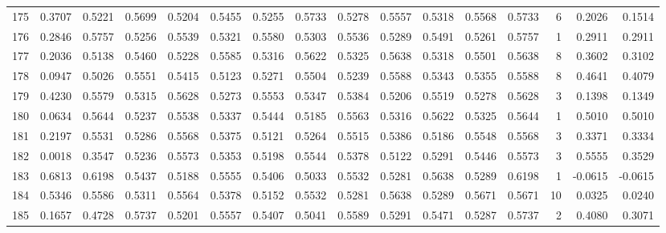 \begin{tabular}{lrrrrrrrrrrrrrrr}
175 &      0.3707 &  0.5221 &  0.5699 &  0.5204 &  0.5455 &  0.5255 &  0.5733 &  0.5278 &  0.5557 &  0.5318 &   0.5568 &     0.5733 &      6 &                    0.2026 &                     0.1514 \\
176 &      0.2846 &  0.5757 &  0.5256 &  0.5539 &  0.5321 &  0.5580 &  0.5303 &  0.5536 &  0.5289 &  0.5491 &   0.5261 &     0.5757 &      1 &                    0.2911 &                     0.2911 \\
177 &      0.2036 &  0.5138 &  0.5460 &  0.5228 &  0.5585 &  0.5316 &  0.5622 &  0.5325 &  0.5638 &  0.5318 &   0.5501 &     0.5638 &      8 &                    0.3602 &                     0.3102 \\
178 &      0.0947 &  0.5026 &  0.5551 &  0.5415 &  0.5123 &  0.5271 &  0.5504 &  0.5239 &  0.5588 &  0.5343 &   0.5355 &     0.5588 &      8 &                    0.4641 &                     0.4079 \\
179 &      0.4230 &  0.5579 &  0.5315 &  0.5628 &  0.5273 &  0.5553 &  0.5347 &  0.5384 &  0.5206 &  0.5519 &   0.5278 &     0.5628 &      3 &                    0.1398 &                     0.1349 \\
180 &      0.0634 &  0.5644 &  0.5237 &  0.5538 &  0.5337 &  0.5444 &  0.5185 &  0.5563 &  0.5316 &  0.5622 &   0.5325 &     0.5644 &      1 &                    0.5010 &                     0.5010 \\
181 &      0.2197 &  0.5531 &  0.5286 &  0.5568 &  0.5375 &  0.5121 &  0.5264 &  0.5515 &  0.5386 &  0.5186 &   0.5548 &     0.5568 &      3 &                    0.3371 &                     0.3334 \\
182 &      0.0018 &  0.3547 &  0.5236 &  0.5573 &  0.5353 &  0.5198 &  0.5544 &  0.5378 &  0.5122 &  0.5291 &   0.5446 &     0.5573 &      3 &                    0.5555 &                     0.3529 \\
183 &      0.6813 &  0.6198 &  0.5437 &  0.5188 &  0.5555 &  0.5406 &  0.5033 &  0.5532 &  0.5281 &  0.5638 &   0.5289 &     0.6198 &      1 &                   -0.0615 &                    -0.0615 \\
184 &      0.5346 &  0.5586 &  0.5311 &  0.5564 &  0.5378 &  0.5152 &  0.5532 &  0.5281 &  0.5638 &  0.5289 &   0.5671 &     0.5671 &     10 &                    0.0325 &                     0.0240 \\
185 &      0.1657 &  0.4728 &  0.5737 &  0.5201 &  0.5557 &  0.5407 &  0.5041 &  0.5589 &  0.5291 &  0.5471 &   0.5287 &     0.5737 &      2 &                    0.4080 &                     0.3071 \\

\end{tabular}
